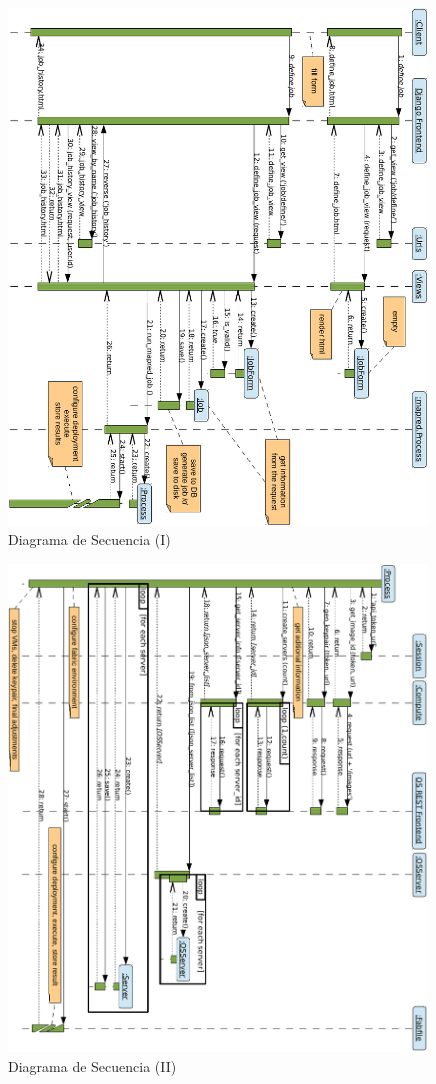 \begin{figure}[tbp]
\begin{center}
\includegraphics[width=0.99\textwidth]{imagenes/033.pdf}
 \caption{Diagrama de Secuencia (I)}
\label{fig:secuencia1}
\end{center}
\end{figure}

\begin{figure}[tbp]
\begin{center}
\includegraphics[width=0.99\textwidth]{imagenes/034.pdf}
 \caption{Diagrama de Secuencia (II)}
\label{fig:secuencia2}
\end{center}
\end{figure}

